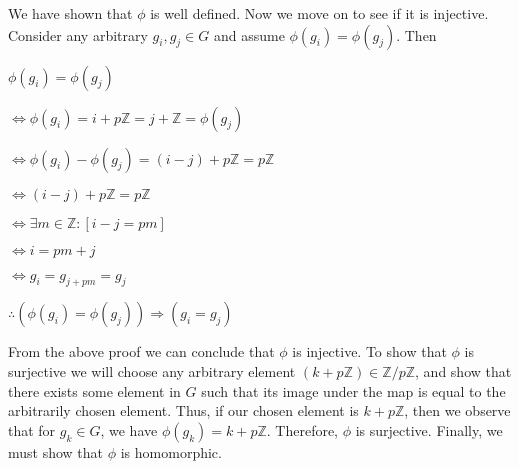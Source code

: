 \documentclass[12pt, a4paper]{article}
\begin{document}
We have shown that $\phi$ is well defined. Now we move on to see if it is injective. Consider any arbitrary $g_i,g_j\in G$ and assume $\phi(g_i)=\phi(g_j)$. Then\par

\vspace{4mm}

\hspace{10mm} $\phi(g_i)=\phi(g_j)$

\vspace{2mm}

\hspace{18mm} $\Leftrightarrow\phi(g_i)=i+p\mathbb{Z}=j+\mathbb{Z}=\phi(g_j)$

\vspace{2mm}

\hspace{18mm} $\Leftrightarrow\phi(g_i)-\phi(g_j)=(i-j)+p\mathbb{Z}=p\mathbb{Z}$

\vspace{2mm}

\hspace{18mm} $\Leftrightarrow(i-j)+p\mathbb{Z}=p\mathbb{Z}$

\vspace{2mm}

\hspace{18mm} $\Leftrightarrow\exists m\in\mathbb{Z}\colon[i-j=pm]$

\vspace{2mm}

\hspace{18mm} $\Leftrightarrow i=pm+j$

\vspace{2mm}

\hspace{18mm} $\Leftrightarrow g_i=g_{j+pm}=g_j$

\vspace{2mm}

\hspace{18mm} $\therefore$\hspace{3mm}$(\phi(g_i)=\phi(g_j))\Rightarrow (g_i=g_j)$

\vspace{4mm}

    From the above proof we can conclude that $\phi$ is injective. To show that $\phi$ is surjective we will choose any arbitrary element $(k+p\mathbb{Z})\in\mathbb{Z}/p\mathbb{Z}$, and show that there exists some element in $G$ such that its image under the map is equal to the arbitrarily chosen element. Thus, if our chosen element is $k+p\mathbb{Z}$, then we observe that for $g_k\in G$, we have $\phi(g_k)=k+p\mathbb{Z}$. Therefore, $\phi$ is surjective. Finally, we must show that $\phi$ is homomorphic.\par
    
\end{document}
